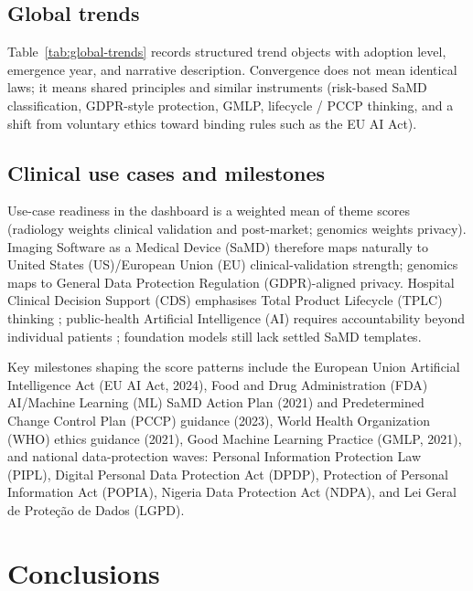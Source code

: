 \documentclass[12pt,a4paper]{report}
\begin{document}


\clearpage
\section{Global trends}

Table~\ref{tab:global-trends} records structured trend objects with adoption level, emergence year, and narrative description. Convergence does not mean identical laws; it means shared principles and similar instruments (risk-based SaMD classification, GDPR-style protection, GMLP, lifecycle / PCCP thinking, and a shift from voluntary ethics toward binding rules such as the EU AI Act).



\section{Clinical use cases and milestones}

Use-case readiness in the dashboard is a weighted mean of theme scores (radiology weights clinical validation and post-market; genomics weights privacy). Imaging Software as a Medical Device (SaMD) therefore maps naturally to United States (US)/European Union (EU) clinical-validation strength; genomics maps to General Data Protection Regulation (GDPR)-aligned privacy. Hospital Clinical Decision Support (CDS) emphasises Total Product Lifecycle (TPLC) thinking \cite{hwang2019,petersen2022}; public-health Artificial Intelligence (AI) requires accountability beyond individual patients \cite{who2021}; foundation models still lack settled SaMD templates.

Key milestones shaping the score patterns include the European Union Artificial Intelligence Act (EU AI Act, 2024), Food and Drug Administration (FDA) AI/Machine Learning (ML) SaMD Action Plan (2021) and Predetermined Change Control Plan (PCCP) guidance (2023), World Health Organization (WHO) ethics guidance (2021), Good Machine Learning Practice (GMLP, 2021), and national data-protection waves: Personal Information Protection Law (PIPL), Digital Personal Data Protection Act (DPDP), Protection of Personal Information Act (POPIA), Nigeria Data Protection Act (NDPA), and Lei Geral de Prote\c{c}\~{a}o de Dados (LGPD).

\chapter{Conclusions}
\label{ch:conclusion}
\end{document}
